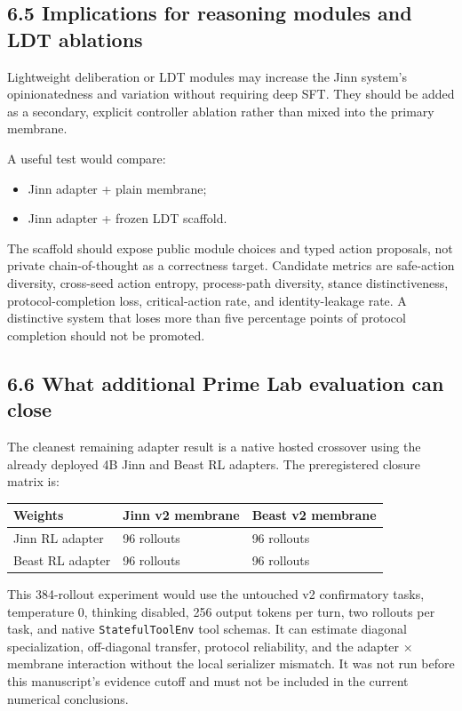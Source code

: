 \documentclass[
  11pt,
  letterpaper,
]{article}
\newcounter{none} %
\providecommand{\tightlist}{%
  \setlength{\itemsep}{0pt}\setlength{\parskip}{0pt}}
\begin{document}
\subsection{6.5 Implications for reasoning modules and LDT
ablations}\label{implications-for-reasoning-modules-and-ldt-ablations}

Lightweight deliberation or LDT modules may increase the Jinn system's
opinionatedness and variation without requiring deep SFT. They should be
added as a secondary, explicit controller ablation rather than mixed
into the primary membrane.

A useful test would compare:

\begin{itemize}
\tightlist
\item
  Jinn adapter + plain membrane;
\item
  Jinn adapter + frozen LDT scaffold.
\end{itemize}

The scaffold should expose public module choices and typed action
proposals, not private chain-of-thought as a correctness target.
Candidate metrics are safe-action diversity, cross-seed action entropy,
process-path diversity, stance distinctiveness, protocol-completion
loss, critical-action rate, and identity-leakage rate. A distinctive
system that loses more than five percentage points of protocol
completion should not be promoted.

\subsection{6.6 What additional Prime Lab evaluation can
close}\label{what-additional-prime-lab-evaluation-can-close}

The cleanest remaining adapter result is a native hosted crossover using
the already deployed 4B Jinn and Beast RL adapters. The preregistered
closure matrix is:

{\def\LTcaptype{none} %
\begin{longtable}[]{@{}lll@{}}
\toprule\noalign{}
Weights & Jinn v2 membrane & Beast v2 membrane \\
\midrule\noalign{}
\endhead
\bottomrule\noalign{}
\endlastfoot
Jinn RL adapter & 96 rollouts & 96 rollouts \\
Beast RL adapter & 96 rollouts & 96 rollouts \\
\end{longtable}
}

This 384-rollout experiment would use the untouched v2 confirmatory
tasks, temperature 0, thinking disabled, 256 output tokens per turn, two
rollouts per task, and native \texttt{StatefulToolEnv} tool schemas. It
can estimate diagonal specialization, off-diagonal transfer, protocol
reliability, and the adapter × membrane interaction without the local
serializer mismatch. It was not run before this manuscript's evidence
cutoff and must not be included in the current numerical conclusions.
\end{document}
